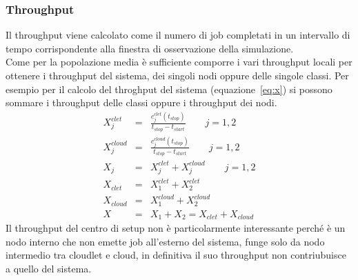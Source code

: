\subsubsection{Throughput}
Il throughput viene calcolato come il numero di job completati in un intervallo
di tempo corrispondente alla finestra di osservazione della simulazione.\\
Come per la popolazione media è sufficiente comporre i vari throughput locali
per ottenere i throughput del sistema, dei singoli nodi oppure delle singole
classi. Per esempio per il calcolo del throghput del sistema
(equazione~\ref{eq:x}) si possono sommare i throughput delle classi oppure i
throughput dei nodi.
\begin{eqnarray}
\label{eq:xjclet}
X_j^{clet} & = & \frac{c_j^{clet}(t_{stop})}{t_{stop} - t_{start}} 
\qquad j = 1, 2 
\\[10pt]
\label{eq:xjcloud}
X_j^{cloud} & = & \frac{c_j^{cloud}(t_{stop})}{t_{stop} - t_{start}} 
\qquad j = 1, 2 
\\[10pt]
\label{eq:xj}
X_j & = & X_j^{clet} + X_j^{cloud}
\qquad j = 1, 2 
\\[10pt]
\label{eq:xclet}
X_{clet} & = & X_1^{clet} + X_2^{clet}
\\[10pt]
\label{eq:xcloud}
X_{cloud} & = & X_1^{cloud} + X_2^{cloud}
\\[10pt]
\label{eq:x}
X & = & X_1 + X_2 = X_{clet} + X_{cloud}
\end{eqnarray}
Il throughput del centro di setup non è particolarmente interessante perché è un
nodo interno che non emette job all'esterno del sistema, funge solo da nodo
intermedio tra cloudlet e cloud, in definitiva il suo throughput non
contriubuisce a quello del sistema.
%
